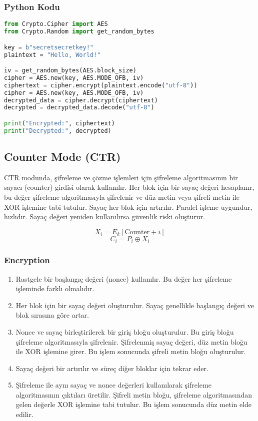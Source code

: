 \subsubsection{Python Kodu}

\begin{lstlisting}[language=Python]
from Crypto.Cipher import AES
from Crypto.Random import get_random_bytes

key = b"secretsecretkey!"
plaintext = "Hello, World!"

iv = get_random_bytes(AES.block_size)
cipher = AES.new(key, AES.MODE_OFB, iv)
ciphertext = cipher.encrypt(plaintext.encode("utf-8"))
cipher = AES.new(key, AES.MODE_OFB, iv)
decrypted_data = cipher.decrypt(ciphertext)
decrypted = decrypted_data.decode("utf-8")

print("Encrypted:", ciphertext)
print("Decrypted:", decrypted)
\end{lstlisting}

\newpage

\subsection{Counter Mode (CTR)}

CTR modunda, şifreleme ve çözme işlemleri için şifreleme algoritmasının bir sayacı (counter) girdisi olarak kullanılır. Her blok için bir sayaç değeri hesaplanır, bu değer şifreleme algoritmasıyla şifrelenir ve düz metin veya şifreli metin ile XOR işlemine tabi tutulur. Sayaç her blok için artırılır. Paralel işleme uygundur, hızlıdır. Sayaç değeri yeniden kullanılırsa güvenlik riski oluşturur.

\[ X_i = E_k [\text{Counter} + i] \]
\[ C_i = P_i \oplus X_i \]

\subsubsection{Encryption}

\begin{enumerate}
    \item Rastgele bir başlangıç değeri (nonce) kullanılır. Bu değer her şifreleme işleminde farklı olmalıdır.
    \item Her blok için bir sayaç değeri oluşturulur. Sayaç genellikle başlangıç değeri ve blok sırasına göre artar.
    \item Nonce ve sayaç birleştirilerek bir giriş bloğu oluşturulur. Bu giriş bloğu şifreleme algoritmasıyla şifrelenir. Şifrelenmiş sayaç değeri, düz metin bloğu ile XOR işlemine girer. Bu işlem sonucunda şifreli metin bloğu oluşturulur.
    \item Sayaç değeri bir artırılır ve süreç diğer bloklar için tekrar eder.
    \item Şifreleme ile aynı sayaç ve nonce değerleri kullanılarak şifreleme algoritmasının çıktıları üretilir. Şifreli metin bloğu, şifreleme algoritmasından gelen değerle XOR işlemine tabi tutulur. Bu işlem sonucunda düz metin elde edilir.
\end{enumerate}

